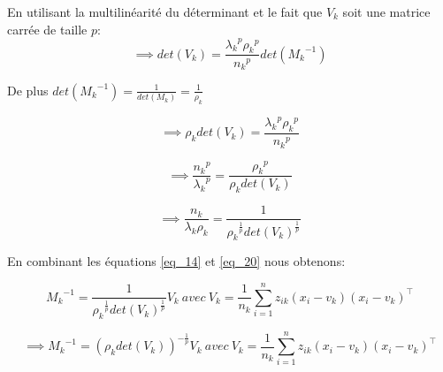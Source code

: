 \documentclass[a4paper,11pt,oneside,roman]{article}
\begin{document}
    En utilisant la multilinéarité du déterminant et le fait que $V_k$ soit une matrice carrée de taille $p$:
    \begin{equation}
        \implies det(V_k) = \frac{{\lambda_k}^p {\rho_k}^p}{{n_k}^p} det({M_k}^{-1})
    \end{equation}

    De plus $det({M_k}^{-1}) = \frac{1}{det(M_k)} = \frac{1}{\rho_k}$

    \begin{equation}
        \implies \rho_k det(V_k) = \frac{{\lambda_k}^p {\rho_k}^{p}}{{n_k}^p}
    \end{equation}

    \begin{equation}
        \implies \frac{{n_k}^p}{{\lambda_k}^p} = \frac{{\rho_k}^{p}}{\rho_k det(V_k)} 
    \end{equation}

    \begin{equation}
        \implies \frac{n_k}{\lambda_k \rho_k} = \frac{1}{{\rho_k}^{\frac{1}{p}}{det(V_k)}^{\frac{1}{p}}}
        \label{eq_20}
    \end{equation}

    En combinant les équations \ref{eq_14} et \ref{eq_20} nous obtenons:

    \begin{equation}
        {M_k}^{-1} = \frac{1}{{\rho_k}^{\frac{1}{p}}{det(V_k)}^{\frac{1}{p}}}V_k \ avec \ V_k = \frac{1}{n_k}\sum^{n}_{i=1} z_{ik} (x_i-v_k)(x_i-v_k)^\top
    \end{equation}

    \begin{equation}
        \implies {M_k}^{-1} = (\rho_k det(V_k))^{-\frac{1}{p}}V_k \ avec \ V_k = \frac{1}{n_k}\sum^{n}_{i=1} z_{ik} (x_i-v_k)(x_i-v_k)^\top
    \end{equation}

    
\end{document}
